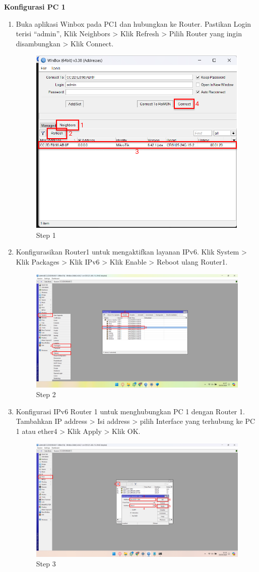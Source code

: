 \begin{center}
    \textbf{Konfigurasi PC 1}
    \begin{enumerate}

        \item Buka aplikasi Winbox pada PC1 dan hubungkan ke Router. Pastikan Login terisi “admin”, Klik Neighbors > Klik Refresh > Pilih Router yang ingin disambungkan > Klik Connect.
        \begin{figure}[H]
			\centering
			\includegraphics[width=0.5\linewidth]{P5/img/pc1/Step 1.png}
			\caption{Step 1}
			\label{fig:Step 1(PC 1)}
		\end{figure}

        \item Konfigurasikan Router1 untuk mengaktifkan layanan IPv6. Klik System > Klik Packages > Klik IPv6 > Klik Enable > Reboot ulang Router1.
        \begin{figure}[H]
			\centering
			\includegraphics[width=0.5\linewidth]{P5/img/pc1/Step 2.png}
			\caption{Step 2}
			\label{fig:Step 2(PC 1)}
        \end{figure}

        \item Konfigurasi IPv6 Router 1 untuk menghubungkan PC 1 dengan Router 1. Tambahkan IP address > Isi address > pilih Interface yang terhubung ke PC 1 atau ether4 > Klik Apply > Klik OK.
        \begin{figure}[H]
			\centering
			\includegraphics[width=0.8\linewidth]{P5/img/pc1/Step 3.png}
			\caption{Step 3}
			\label{fig:Step 3(PC 1)}
		\end{figure}


\end{enumerate}
\end{center}

